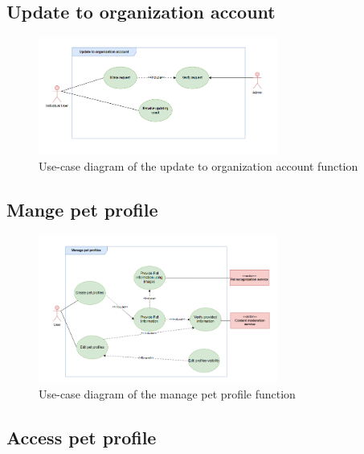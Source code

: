 

\subsection{Update to organization account}

\begin{figure}[H]
  \centering
  \includegraphics[width=0.7\textwidth]{Figures/update_org_ucd.png}
  \caption{Use-case diagram of the update to organization account function}
  \label{fig:update-org_activity_diagram}
\end{figure}



\subsection{Mange pet profile}

\begin {figure}[H]
\centering
\includegraphics[width=0.7\textwidth]{Figures/manage_pet_ucd.png}
\caption{Use-case diagram of the manage pet profile function}
\label{fig:manage-pet-activity-diagram}
\end{figure}



\subsection{Access pet profile}

